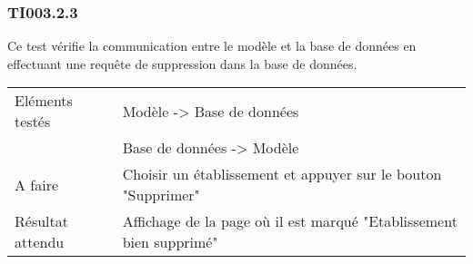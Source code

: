   		
  	\subsubsection{TI003.2.3}
  	\label{TI003.2.3}
  		Ce test vérifie la communication entre le modèle et la base de données en effectuant une requête de suppression dans la base de données.
  		\begin{center}
    	 		\begin{tabular}[h]{|p{}|p{}|}
			\hline
				Eléments testés & Modèle -> Base de données  \\
							    &  Base de données -> Modèle \\\hline
    				A faire & Choisir un établissement et appuyer sur le bouton "Supprimer" \\\hline
    				Résultat attendu & Affichage de la page où il est marqué "Etablissement bien supprimé" \\\hline
     		\end{tabular}
  		\end{center}	
  	
  		